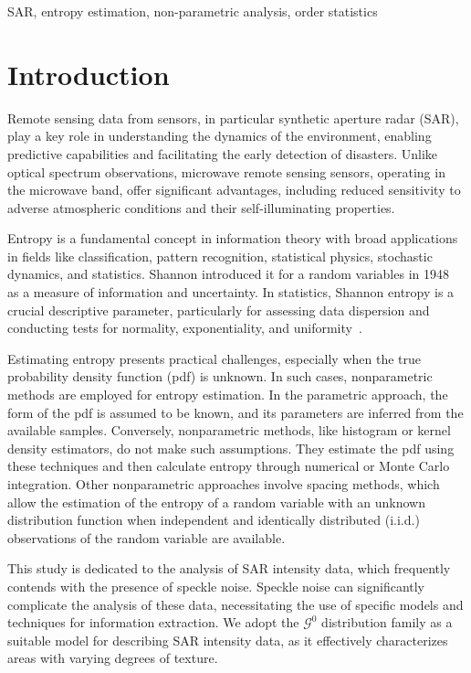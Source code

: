 \documentclass[conference]{IEEEtran}
\begin{document}
{\begin{IEEEkeywords}
SAR, entropy estimation, non-parametric analysis, order statistics
\end{IEEEkeywords}

\section{Introduction}\label{sec_01}

Remote sensing data from sensors, in particular synthetic aperture radar (SAR), play a key role in understanding the dynamics of the environment, enabling predictive capabilities and facilitating the early detection of disasters. Unlike optical spectrum observations, microwave remote sensing sensors, operating in the microwave band, offer significant advantages, including reduced sensitivity to adverse atmospheric conditions and their self-illuminating properties.

Entropy is a fundamental concept in information theory with broad applications in fields like classification, pattern recognition, statistical physics, stochastic dynamics, and statistics.
Shannon introduced it for a random variables in 1948~\cite{Shannon1948} as a measure of information and uncertainty. 
In statistics, Shannon entropy is a crucial descriptive parameter, particularly for assessing data dispersion and conducting tests for normality, exponentiality, and uniformity~\cite{Wieczorkowski1999}.

Estimating entropy presents practical challenges, especially when the true probability density function (pdf) is unknown.
In such cases, nonparametric methods are employed for entropy estimation. 
In the parametric approach, the form of the pdf is assumed to be known, and its parameters are inferred from the available samples. 
Conversely, nonparametric methods, like histogram or kernel density estimators, do not make such assumptions. 
They estimate the pdf using these techniques and then calculate entropy through numerical or Monte Carlo integration. 
Other nonparametric approaches involve spacing methods, which allow the estimation of the entropy of a random variable with an unknown distribution function when independent and identically distributed (i.i.d.) observations of the random variable are available.


This study is dedicated to the analysis of SAR intensity data, which frequently contends with the presence of speckle noise. 
Speckle noise can significantly complicate the analysis of these data, necessitating the use of specific models and techniques for information extraction. 
We adopt the $\mathcal G^0$ distribution family as a suitable model for describing SAR intensity data, as it effectively characterizes areas with varying degrees of texture.


}
\end{document}
